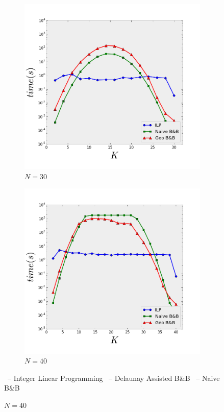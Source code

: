 \begin{figure}[t]
  \begin{subfigure}[b]{0.3\linewidth}
    \centering
    \includegraphics[width=0.9\linewidth]{Pictures/n30} 
    \caption{$N=30$} 
    \label{fig:fixed_n:c} 
  \end{subfigure}%
  \begin{subfigure}[b]{0.3\linewidth}
    \centering
    \includegraphics[width=0.9\linewidth]{Pictures/n40} 
    \caption{$N=40$} 
    \label{fig:fixed_n:d} 
  \end{subfigure} 
  \begin{center}
  \footnotesize
  \textcolor{blue}{\cmark}\ -- Integer Linear Programming \textcolor{red}{\tmark}\ -- Delaunay Assisted B\&B \textcolor{green}{\smark}\ -- Naive B\&B
  \end{center}
\end{figure}

